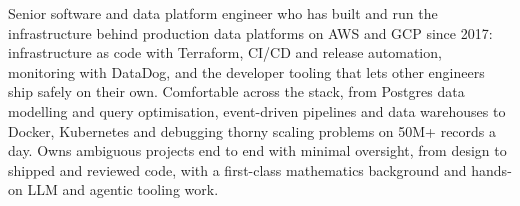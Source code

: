
\begin{cvparagraph}

Senior software and data platform engineer who has built and run the infrastructure behind production data platforms on AWS and GCP since 2017: infrastructure as code with Terraform, CI/CD and release automation, monitoring with DataDog, and the developer tooling that lets other engineers ship safely on their own. Comfortable across the stack, from Postgres data modelling and query optimisation, event-driven pipelines and data warehouses to Docker, Kubernetes and debugging thorny scaling problems on 50M+ records a day. Owns ambiguous projects end to end with minimal oversight, from design to shipped and reviewed code, with a first-class mathematics background and hands-on LLM and agentic tooling work.

\end{cvparagraph}
